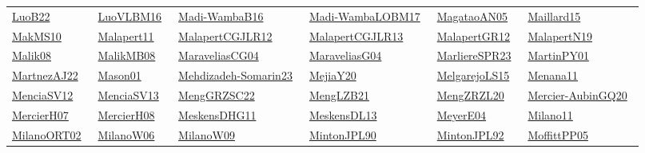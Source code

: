 \begin{longtable}{*{6}{l}}
\href{../works/LuoB22.pdf}{LuoB22}~\cite{LuoB22} & \href{../works/LuoVLBM16.pdf}{LuoVLBM16}~\cite{LuoVLBM16} & \href{../works/Madi-WambaB16.pdf}{Madi-WambaB16}~\cite{Madi-WambaB16} & \href{../works/Madi-WambaLOBM17.pdf}{Madi-WambaLOBM17}~\cite{Madi-WambaLOBM17} & \href{../}{MagataoAN05}~\cite{MagataoAN05} & \href{../works/Maillard15.pdf}{Maillard15}~\cite{Maillard15}\\ 
\href{../works/MakMS10.pdf}{MakMS10}~\cite{MakMS10} & \href{../works/Malapert11.pdf}{Malapert11}~\cite{Malapert11} & \href{../works/MalapertCGJLR12.pdf}{MalapertCGJLR12}~\cite{MalapertCGJLR12} & \href{../works/MalapertCGJLR13.pdf}{MalapertCGJLR13}~\cite{MalapertCGJLR13} & \href{../works/MalapertGR12.pdf}{MalapertGR12}~\cite{MalapertGR12} & \href{../works/MalapertN19.pdf}{MalapertN19}~\cite{MalapertN19}\\ 
\href{../works/Malik08.pdf}{Malik08}~\cite{Malik08} & \href{../works/MalikMB08.pdf}{MalikMB08}~\cite{MalikMB08} & \href{../works/MaraveliasCG04.pdf}{MaraveliasCG04}~\cite{MaraveliasCG04} & \href{../works/MaraveliasG04.pdf}{MaraveliasG04}~\cite{MaraveliasG04} & \href{../works/MarliereSPR23.pdf}{MarliereSPR23}~\cite{MarliereSPR23} & \href{../works/MartinPY01.pdf}{MartinPY01}~\cite{MartinPY01}\\ 
\href{../}{MartnezAJ22}~\cite{MartnezAJ22} & \href{../works/Mason01.pdf}{Mason01}~\cite{Mason01} & \href{../works/Mehdizadeh-Somarin23.pdf}{Mehdizadeh-Somarin23}~\cite{Mehdizadeh-Somarin23} & \href{../works/MejiaY20.pdf}{MejiaY20}~\cite{MejiaY20} & \href{../works/MelgarejoLS15.pdf}{MelgarejoLS15}~\cite{MelgarejoLS15} & \href{../works/Menana11.pdf}{Menana11}~\cite{Menana11}\\ 
\href{../works/MenciaSV12.pdf}{MenciaSV12}~\cite{MenciaSV12} & \href{../works/MenciaSV13.pdf}{MenciaSV13}~\cite{MenciaSV13} & \href{../works/MengGRZSC22.pdf}{MengGRZSC22}~\cite{MengGRZSC22} & \href{../works/MengLZB21.pdf}{MengLZB21}~\cite{MengLZB21} & \href{../works/MengZRZL20.pdf}{MengZRZL20}~\cite{MengZRZL20} & \href{../works/Mercier-AubinGQ20.pdf}{Mercier-AubinGQ20}~\cite{Mercier-AubinGQ20}\\ 
\href{../works/MercierH07.pdf}{MercierH07}~\cite{MercierH07} & \href{../works/MercierH08.pdf}{MercierH08}~\cite{MercierH08} & \href{../works/MeskensDHG11.pdf}{MeskensDHG11}~\cite{MeskensDHG11} & \href{../works/MeskensDL13.pdf}{MeskensDL13}~\cite{MeskensDL13} & \href{../works/MeyerE04.pdf}{MeyerE04}~\cite{MeyerE04} & \href{../}{Milano11}~\cite{Milano11}\\ 
\href{../}{MilanoORT02}~\cite{MilanoORT02} & \href{../works/MilanoW06.pdf}{MilanoW06}~\cite{MilanoW06} & \href{../works/MilanoW09.pdf}{MilanoW09}~\cite{MilanoW09} & \href{../works/MintonJPL90.pdf}{MintonJPL90}~\cite{MintonJPL90} & \href{../works/MintonJPL92.pdf}{MintonJPL92}~\cite{MintonJPL92} & \href{../works/MoffittPP05.pdf}{MoffittPP05}~\cite{MoffittPP05}\\ 

\end{longtable}
